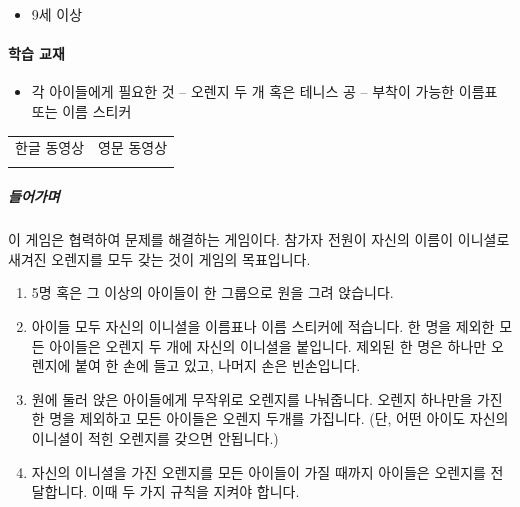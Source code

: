\documentclass[]{article}
\begin{document}
\begin{itemize}
\itemsep1pt\parskip0pt
\item
  9세 이상
\end{itemize}

\mbox{}\paragraph{학습 교재}\label{section-138}

\begin{itemize}
\itemsep1pt\parskip0pt
\item
  각 아이들에게 필요한 것 -- 오렌지 두 개 혹은 테니스 공 -- 부착이
  가능한 이름표 또는 이름 스티커
\end{itemize}


\begin{longtable}[c]{@{}ll@{}}
\toprule
\begin{minipage}[t]{0.47\columnwidth}\raggedright\strut
한글 동영상
\strut\end{minipage} &
\begin{minipage}[t]{0.47\columnwidth}\raggedright\strut
영문 동영상
\strut\end{minipage}\tabularnewline
\begin{minipage}[t]{0.47\columnwidth}\raggedright\strut
\strut\end{minipage} &
\begin{minipage}[t]{0.47\columnwidth}\raggedright\strut
\strut\end{minipage}\tabularnewline
\bottomrule
\end{longtable}

\subparagraph{들어가며}\label{section-139}

이 게임은 협력하여 문제를 해결하는 게임이다. 참가자 전원이 자신의 이름이
이니셜로 새겨진 오렌지를 모두 갖는 것이 게임의 목표입니다.

\begin{enumerate}
\item
  5명 혹은 그 이상의 아이들이 한 그룹으로 원을 그려 앉습니다.
\item
  아이들 모두 자신의 이니셜을 이름표나 이름 스티커에 적습니다. 한 명을
  제외한 모든 아이들은 오렌지 두 개에 자신의 이니셜을 붙입니다. 제외된
  한 명은 하나만 오렌지에 붙여 한 손에 들고 있고, 나머지 손은
  빈손입니다.
\item
  원에 둘러 앉은 아이들에게 무작위로 오렌지를 나눠줍니다. 오렌지
  하나만을 가진 한 명을 제외하고 모든 아이들은 오렌지 두개를 가집니다.
  (단, 어떤 아이도 자신의 이니셜이 적힌 오렌지를 갖으면 안됩니다.)
\item
  자신의 이니셜을 가진 오렌지를 모든 아이들이 가질 때까지 아이들은
  오렌지를 전달합니다. 이때 두 가지 규칙을 지켜야 합니다.
\end{enumerate}
\end{document}
